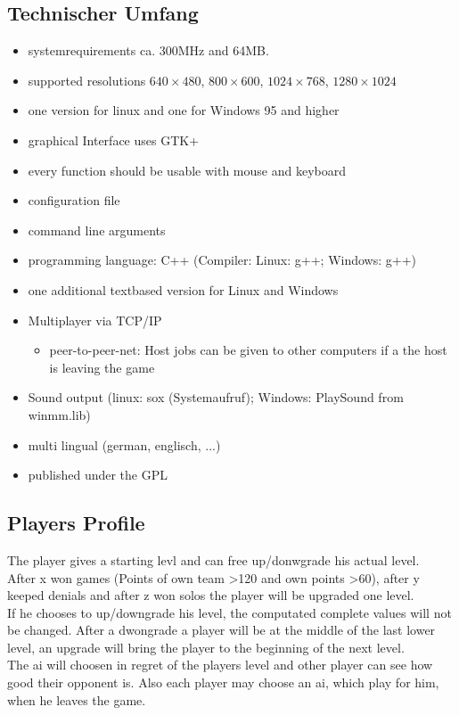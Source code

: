\documentclass[12pt,a4paper]{article}
\begin{document}
\subsection{Technischer Umfang}
\begin{itemize}
\item systemrequirements ca. 300MHz and 64MB.
\item supported resolutions $640\times 480$, $800\times 600$, $1024\times 768$, $1280\times 1024$
\item one version for linux and one for Windows 95 and higher
\item graphical Interface uses GTK+
\item every function should be usable with mouse and keyboard
\item configuration file
\item command line arguments
\item programming language: C++ (Compiler: Linux: g++; Windows: g++)
\item one additional textbased version for Linux and Windows
\item Multiplayer via TCP/IP
\begin{itemize}
\item peer-to-peer-net: Host jobs can be given to other computers if a the host is leaving the game
\end{itemize}
\item Sound output (linux: sox (Systemaufruf); Windows: PlaySound  from winmm.lib)
\item multi lingual (german, englisch, ...)
\item published under the GPL
\end{itemize}
\subsection{Players Profile}
The player gives a starting levl and can free up/donwgrade his actual level.\\
After x won games (Points of own team \textgreater 120 and own points \textgreater 60), after y keeped denials
and after z won solos the player will be upgraded one level.\\
If he chooses to up/downgrade his level, the computated complete values will not be changed.
After a dwongrade a player will be at the middle of the last lower level, an upgrade will bring the player
to the beginning of the next level.\\
The ai will choosen in regret of the players level and other player can see how good their opponent is.
Also each player may choose an ai, which play for him, when he leaves the game.
\end{document}
